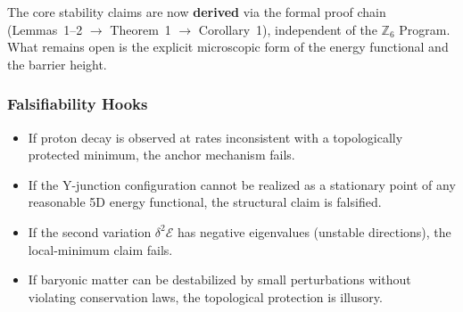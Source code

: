 \noindent
The core stability claims are now \textbf{derived} via the formal proof chain
(Lemmas~1--2 $\to$ Theorem~1 $\to$ Corollary~1), independent of the $\mathbb{Z}_6$ Program.
What remains open is the explicit microscopic form of the energy functional and the barrier height.

\subsubsection{Falsifiability Hooks}

\begin{tcolorbox}[falsifiability]
\begin{itemize}[nosep]
  \item If proton decay is observed at rates inconsistent with a topologically protected minimum, the
        anchor mechanism fails.
  \item If the Y-junction configuration cannot be realized as a stationary point of any reasonable
        5D energy functional, the structural claim is falsified.
  \item If the second variation $\delta^2\mathcal{E}$ has negative eigenvalues (unstable directions),
        the local-minimum claim fails.
  \item If baryonic matter can be destabilized by small perturbations without violating conservation
        laws, the topological protection is illusory.
\end{itemize}
\end{tcolorbox}

